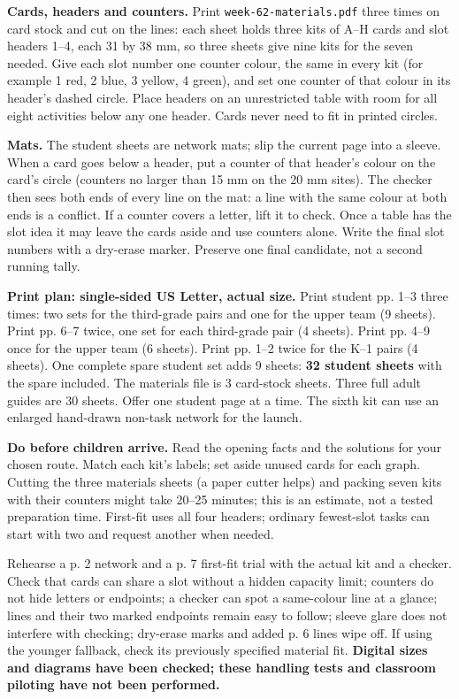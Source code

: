 \documentclass[10pt,letterpaper]{article}
\newcommand{\topic}[1]{\vspace{3pt}{\large\bfseries #1}\par}
\newcommand{\labelled}[2]{\textbf{#1} #2\par}
\begin{document}
\labelled{Cards, headers and counters.}{Print \texttt{week-62-materials.pdf} three times on card stock and cut on the lines: each sheet holds three kits of A--H cards and slot headers 1--4, each 31 by 38 mm, so three sheets give nine kits for the seven needed. Give each slot number one counter colour, the same in every kit (for example 1 red, 2 blue, 3 yellow, 4 green), and set one counter of that colour in its header's dashed circle. Place headers on an unrestricted table with room for all eight activities below any one header. Cards never need to fit in printed circles.}
\labelled{Mats.}{The student sheets are network mats; slip the current page into a sleeve. When a card goes below a header, put a counter of that header's colour on the card's circle (counters no larger than 15 mm on the 20 mm sites). The checker then sees both ends of every line on the mat: a line with the same colour at both ends is a conflict. If a counter covers a letter, lift it to check. Once a table has the slot idea it may leave the cards aside and use counters alone. Write the final slot numbers with a dry-erase marker. Preserve one final candidate, not a second running tally.}
\labelled{Print plan: single-sided US Letter, actual size.}{Print student pp. 1--3 three times: two sets for the third-grade pairs and one for the upper team (9 sheets). Print pp. 6--7 twice, one set for each third-grade pair (4 sheets). Print pp. 4--9 once for the upper team (6 sheets). Print pp. 1--2 twice for the K--1 pairs (4 sheets). One complete spare student set adds 9 sheets: \textbf{32 student sheets} with the spare included. The materials file is 3 card-stock sheets. Three full adult guides are 30 sheets. Offer one student page at a time. The sixth kit can use an enlarged hand-drawn non-task network for the launch.}
\labelled{Do before children arrive.}{Read the opening facts and the solutions for your chosen route. Match each kit's labels; set aside unused cards for each graph. Cutting the three materials sheets (a paper cutter helps) and packing seven kits with their counters might take 20--25 minutes; this is an estimate, not a tested preparation time. First-fit uses all four headers; ordinary fewest-slot tasks can start with two and request another when needed.}
\topic{Physical pretest still to perform}
Rehearse a p. 2 network and a p. 7 first-fit trial with the actual kit and a checker. Check that cards can share a slot without a hidden capacity limit; counters do not hide letters or endpoints; a checker can spot a same-colour line at a glance; lines and their two marked endpoints remain easy to follow; sleeve glare does not interfere with checking; dry-erase marks and added p. 6 lines wipe off. If using the younger fallback, check its previously specified material fit. \textbf{Digital sizes and diagrams have been checked; these handling tests and classroom piloting have not been performed.}
\end{document}

